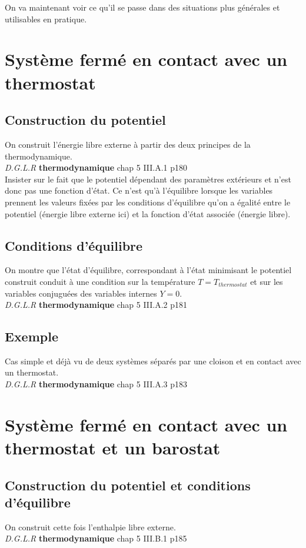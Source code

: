 \documentclass[12pt,prb,aps,epsf]{article}
\begin{document}
On va maintenant voir ce qu'il se passe dans des situations plus générales et utilisables en pratique.


\section{Système fermé en contact avec un thermostat}
\subsection{Construction du potentiel}
On construit l'énergie libre externe à partir des deux principes de la thermodynamique.\\
\textit{D.G.L.R} \textbf{thermodynamique} chap 5 III.A.1 p180\\

Insister sur le fait que le potentiel dépendant des paramètres extérieurs et n'est donc pas une fonction d'état. Ce n'est qu'à l'équilibre lorsque les variables prennent les valeurs fixées par les conditions d'équilibre qu'on a égalité entre le potentiel (énergie libre externe ici) et la fonction d'état associée (énergie libre).

\subsection{Conditions d'équilibre}
On montre que l'état d'équilibre, correspondant à l'état minimisant le potentiel construit conduit à une condition sur la température $T=T_{thermostat}$ et sur les variables conjuguées des variables internes $Y=0$.\\
\textit{D.G.L.R} \textbf{thermodynamique} chap 5 III.A.2 p181

\subsection{Exemple}
Cas simple et déjà vu de deux systèmes séparés par une cloison et en contact avec un thermostat.\\
\textit{D.G.L.R} \textbf{thermodynamique} chap 5 III.A.3 p183

\section{Système fermé en contact avec un thermostat et un barostat}
\subsection{Construction du potentiel et conditions d'équilibre}
On construit cette fois l'enthalpie libre externe.\\
\textit{D.G.L.R} \textbf{thermodynamique} chap 5 III.B.1 p185
\end{document}
